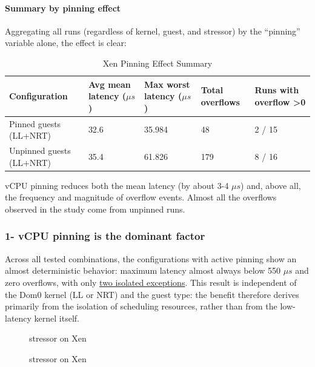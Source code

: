 \paragraph{Summary by pinning effect}\label{summary-by-pinning-effect}

Aggregating all runs (regardless of kernel, guest, and stressor) by the
``pinning'' variable alone, the effect is clear:

\begin{table}
\centering
\caption{Xen Pinning Effect Summary}
\label{tab:xen:pinning}
\begin{tabularx}{\linewidth}{@{}YYYYY@{}}
\toprule
\textbf{Configuration} & \textbf{Avg mean latency ($\mu s$)} & \textbf{Max worst latency ($\mu s$)} & \textbf{Total overflows} & \textbf{Runs with overflow \textgreater0}\tabularnewline
\midrule
Pinned guests (LL+NRT) & 32.6 & 35.984 & 48 & 2 / 15\tabularnewline
Unpinned guests (LL+NRT) & 35.4 & 61.826 & 179 & 8 / 16\tabularnewline
\bottomrule
\end{tabularx}
\end{table}

vCPU pinning reduces both the mean latency (by about 3-4 $\mu s$) and, above
all, the frequency and magnitude of overflow events. Almost all the
overflows observed in the study come from unpinned runs.

\subsubsection{1- vCPU pinning is the dominant
factor}\label{vcpu-pinning-is-the-dominant-factor}

Across all tested combinations, the configurations with active pinning
show an almost deterministic behavior: maximum latency almost always
below 550 $\mu s$ and zero overflows, with only
\protect\hyperlink{4--isolated-anomalies-not-reproducible-between-kernels}{two
isolated exceptions}. This result is independent of the Dom0 kernel (LL
or NRT) and the guest type: the benefit therefore derives primarily from
the isolation of scheduling resources, rather than from the low-latency
kernel itself.

\begin{figure}
\centering

\caption{stressor on Xen}
\end{figure}

\begin{figure}
\centering

\caption{stressor on Xen}
\end{figure}

